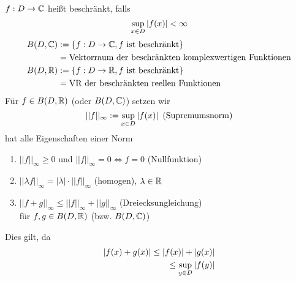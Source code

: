 \documentclass[../ana1.tex]{subfiles}
\begin{document}
\begin{defi}
    \( f: D \rightarrow \mathbb{C} \) heißt beschränkt, falls 
    \[ \underset{x\in D}{\sup} \left|f(x)\right| < \infty \]
    \begin{align*}
        B(D, \mathbb{C}) &:= \{ f: D \rightarrow \mathbb{C}, 
        f \text{ ist beschränkt} \} \\
        &= \text{Vektorraum der beschränkten 
        komplexwertigen Funktionen} \\
        B(D, \mathbb{R}) &:= \{ f: D \rightarrow \mathbb{R}, 
        f \text{ ist beschränkt} \}\\
        &= \text{VR der beschränkten reellen Funktionen}
    \end{align*}
    Für \( f\in B(D,\mathbb{R}) \) (oder \( B(D,\mathbb{C}) \)) setzen wir 
    \[ ||f||_\infty := \underset{x\in D}{\sup} \left|f(x)\right| 
    \text{ (Supremumsnorm)} \]
    hat alle Eigenschaften einer Norm
    \begin{enumerate}
        \item \( ||f||_\infty \geq 0 \) und 
        \( ||f||_\infty = 0 \Leftrightarrow f = 0 \) 
        (Nullfunktion)
        \item \( ||\lambda f||_\infty = |\lambda| \cdot 
        ||f||_\infty \) (homogen), \( \lambda \in \mathbb{R} \)
        \item \( ||f+g||_\infty \leq ||f||_\infty 
        + ||g||_\infty \) (Dreiecksungleichung) \\
        für \( f, g \in B(D, \mathbb{R}) \) (bzw. \( B(D,\mathbb{C}) \))
    \end{enumerate}
    Dies gilt, da
    \begin{align*}
        \left| f(x) + g(x) \right| \leq \left|f(x)\right| + \left|g(x)\right| \\
        \leq \underset{y\in D}{\sup} \left| f(y) \right|
    \end{align*}
\end{defi}
\end{document}
